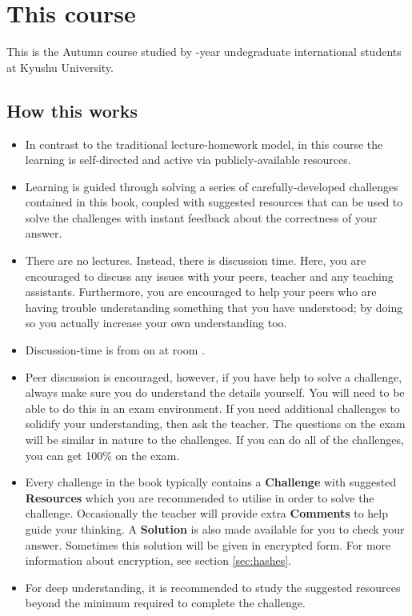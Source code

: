 \section{This course}
This is the Autumn \courseyear \course course studied by \nensei-year undegraduate international students at Kyushu University.

\subsection{How this works}
\begin{itemize}
    \item In contrast to the traditional lecture-homework model, in this course the learning is self-directed and active via publicly-available resources.
    \item Learning is guided through solving a series of carefully-developed challenges contained in this book, coupled with suggested resources that can be used to solve the challenges with instant feedback about the correctness of your answer.
    \item There are no lectures. Instead, there is discussion time. Here, you are encouraged to discuss any issues with your peers, teacher and any teaching assistants. Furthermore, you are encouraged to help your peers who are having trouble understanding something that you have understood; by doing so you actually increase your own understanding too.
    \item Discussion-time is from \disctime on \discdays at room \discroom.
    \item Peer discussion is encouraged, however, if you have help to solve a challenge, always make sure you do understand the details yourself. You will need to be able to do this in an exam environment. If you need additional challenges to solidify your understanding, then ask the teacher. The questions on the exam will be similar in nature to the challenges. If you can do all of the challenges, you can get 100\% on the exam.
    \item Every challenge in the book typically contains a \textbf{Challenge} with suggested \textbf{Resources} which you are recommended to utilise in order to solve the challenge. Occasionally the teacher will provide extra \textbf{Comments} to help guide your thinking. A \textbf{Solution} is also made available for you to check your answer. Sometimes this solution will be given in encrypted form. For more information about encryption, see section \ref{sec:hashes}.
    \item For deep understanding, it is recommended to study the suggested resources beyond the minimum required to complete the challenge.

\end{itemize}
